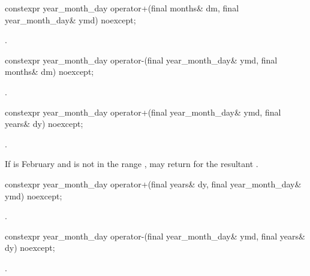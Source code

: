%
\begin{itemdecl}
constexpr year_month_day operator+(final months& dm, final year_month_day& ymd) noexcept;
\end{itemdecl}

\begin{itemdescr}
\pnum
\returns {}.
\end{itemdescr}

%
\begin{itemdecl}
constexpr year_month_day operator-(final year_month_day& ymd, final months& dm) noexcept;
\end{itemdecl}

\begin{itemdescr}
\pnum
\returns {}.
\end{itemdescr}

%
\begin{itemdecl}
constexpr year_month_day operator+(final year_month_day& ymd, final years& dy) noexcept;
\end{itemdecl}

\begin{itemdescr}
\pnum
\returns {}.

\pnum
\begin{note}
If  is February
and  is not in the range ,
 may return  for
the resultant .
\end{note}
\end{itemdescr}

%
\begin{itemdecl}
constexpr year_month_day operator+(final years& dy, final year_month_day& ymd) noexcept;
\end{itemdecl}

\begin{itemdescr}
\pnum
\returns {}.
\end{itemdescr}

%
\begin{itemdecl}
constexpr year_month_day operator-(final year_month_day& ymd, final years& dy) noexcept;
\end{itemdecl}

\begin{itemdescr}
\pnum
\returns {}.
\end{itemdescr}

